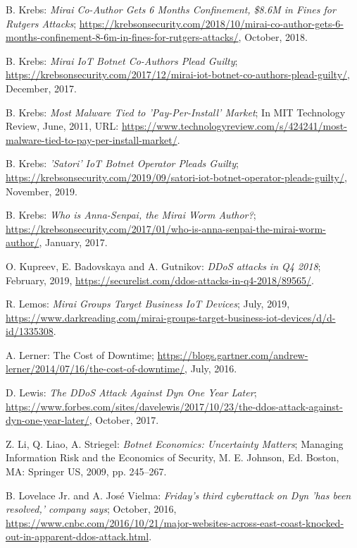 \begin{thebibliography}{99}
 B. Krebs: \emph{Mirai Co-Author Gets 6 Months Confinement, \$8.6M in Fines for Rutgers Attacks}; \url{https://krebsonsecurity.com/2018/10/mirai-co-author-gets-6-months-confinement-8-6m-in-fines-for-rutgers-attacks/}, October, 2018.

 B. Krebs: \emph{Mirai IoT Botnet Co-Authors Plead Guilty}; \url{https://krebsonsecurity.com/2017/12/mirai-iot-botnet-co-authors-plead-guilty/}, December, 2017.

 B. Krebs: \emph{Most Malware Tied to 'Pay-Per-Install' Market}; In MIT Technology Review, June, 2011, URL: \url{https://www.technologyreview.com/s/424241/most-malware-tied-to-pay-per-install-market/}.

 B. Krebs: \emph{'Satori' IoT Botnet Operator Pleads Guilty}; \url{https://krebsonsecurity.com/2019/09/satori-iot-botnet-operator-pleads-guilty/}, November, 2019.

 B. Krebs: \emph{Who is Anna-Senpai, the Mirai Worm Author?}; \url{https://krebsonsecurity.com/2017/01/who-is-anna-senpai-the-mirai-worm-author/}, January, 2017.

 O. Kupreev, E. Badovskaya and A. Gutnikov: \emph{DDoS attacks in Q4 2018}; February, 2019, \url{https://securelist.com/ddos-attacks-in-q4-2018/89565/}.

 R. Lemos: \emph{Mirai Groups Target Business IoT Devices}; July, 2019, \url{https://www.darkreading.com/mirai-groups-target-business-iot-devices/d/d-id/1335308}.

 A. Lerner: The Cost of Downtime; \url{https://blogs.gartner.com/andrew-lerner/2014/07/16/the-cost-of-downtime/}, July, 2016.

 D. Lewis: \emph{The DDoS Attack Against Dyn One Year Later}; \url{https://www.forbes.com/sites/davelewis/2017/10/23/the-ddos-attack-against-dyn-one-year-later/}, October, 2017.

 Z. Li, Q. Liao, A. Striegel:  \emph{Botnet Economics: Uncertainty Matters}; Managing Information Risk and the Economics of Security, M. E. Johnson, Ed. Boston, MA: Springer US, 2009, pp. 245--267.

 B. Lovelace Jr. and A. José Vielma: \emph{Friday's third cyberattack on Dyn 'has been resolved,' company says}; October, 2016, \url{https://www.cnbc.com/2016/10/21/major-websites-across-east-coast-knocked-out-in-apparent-ddos-attack.html}.


\end{thebibliography}
